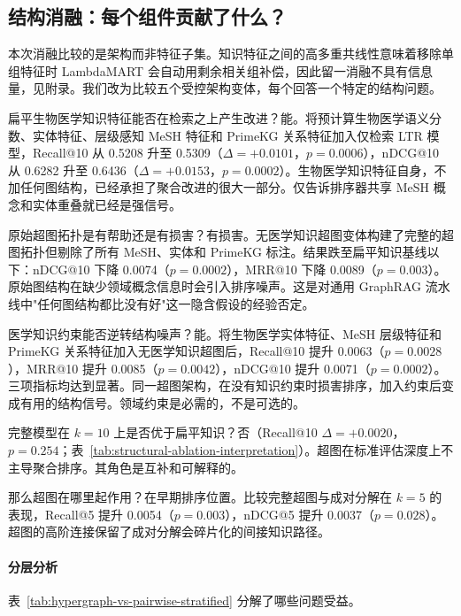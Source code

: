 \subsection{结构消融：每个组件贡献了什么？}
\label{sec:ablation}

本次消融比较的是架构而非特征子集。知识特征之间的高多重共线性意味着移除单组特征时 LambdaMART 会自动用剩余相关组补偿，因此留一消融不具有信息量，见附录。我们改为比较五个受控架构变体，每个回答一个特定的结构问题。



扁平生物医学知识特征能否在检索之上产生改进？能。将预计算生物医学语义分数、实体特征、层级感知 MeSH 特征和 PrimeKG 关系特征加入仅检索 LTR 模型，Recall@10 从 0.5208 升至 0.5309（$\Delta{=}+0.0101$，$p{=}0.0006$），nDCG@10 从 0.6282 升至 0.6436（$\Delta{=}+0.0153$，$p{=}0.0002$）。生物医学知识特征自身，不加任何图结构，已经承担了聚合改进的很大一部分。仅告诉排序器共享 MeSH 概念和实体重叠就已经是强信号。

原始超图拓扑是有帮助还是有损害？有损害。无医学知识超图变体构建了完整的超图拓扑但剔除了所有 MeSH、实体和 PrimeKG 标注。结果跌至扁平知识基线以下：nDCG@10 下降 0.0074（$p{=}0.0002$），MRR@10 下降 0.0089（$p{=}0.003$）。原始图结构在缺少领域概念信息时会引入排序噪声。这是对通用 GraphRAG 流水线中"任何图结构都比没有好"这一隐含假设的经验否定。

医学知识约束能否逆转结构噪声？能。将生物医学实体特征、MeSH 层级特征和 PrimeKG 关系特征加入无医学知识超图后，Recall@10 提升 0.0063（$p{=}0.0028$），MRR@10 提升 0.0085（$p{=}0.0042$），nDCG@10 提升 0.0071（$p{=}0.0002$）。三项指标均达到显著。同一超图架构，在没有知识约束时损害排序，加入约束后变成有用的结构信号。领域约束是必需的，不是可选的。

完整模型在 $k{=}10$ 上是否优于扁平知识？否（Recall@10 $\Delta{=}+0.0020$，$p{=}0.254$；表~\ref{tab:structural-ablation-interpretation}）。超图在标准评估深度上不主导聚合排序。其角色是互补和可解释的。



那么超图在哪里起作用？在早期排序位置。比较完整超图与成对分解在 $k{=}5$ 的表现，Recall@5 提升 0.0054（$p{=}0.003$），nDCG@5 提升 0.0037（$p{=}0.028$）。超图的高阶连接保留了成对分解会碎片化的间接知识路径。

\paragraph{分层分析}
表~\ref{tab:hypergraph-vs-pairwise-stratified} 分解了哪些问题受益。

